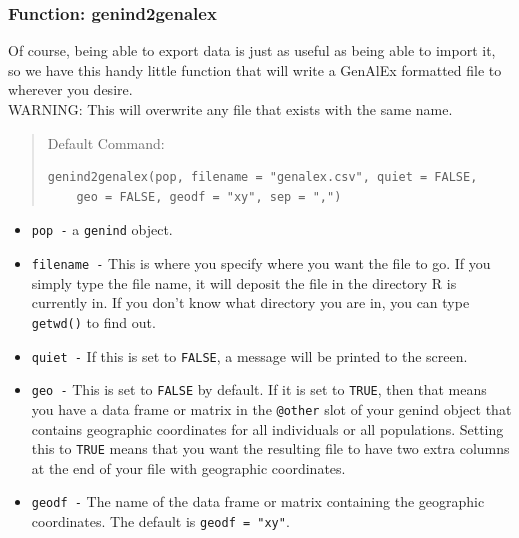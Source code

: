 \documentclass[letterpaper]{article}\usepackage[]{graphicx}\usepackage[]{color}
\makeatletter
\newenvironment{kframe}{%
 \def\at@end@of@kframe{}%
 \ifinner\ifhmode%
  \def\at@end@of@kframe{\end{minipage}}%
  \begin{minipage}{\columnwidth}%
 \fi\fi%
 \def\FrameCommand##1{\hskip\@totalleftmargin \hskip-\fboxsep
 \colorbox{shadecolor}{##1}\hskip-\fboxsep
     \hskip-\linewidth \hskip-\@totalleftmargin \hskip\columnwidth}%
 \MakeFramed {\advance\hsize-\width
   \@totalleftmargin\z@ \linewidth\hsize
   \@setminipage}}%
 {\par\unskip\endMakeFramed%
 \at@end@of@kframe}
\newenvironment{knitrout}{}{} %
\newcommand{\tab}{\hspace*{1em}}
\makeatother
\begin{document}
\subsubsection{Function: genind2genalex}\label{intro:import:genind2genalex}

\tab\tab Of course, being able to export data is just as useful as being able to import it, so we have this handy little function that will write a GenAlEx formatted file to wherever you desire.\\ 
WARNING: This will overwrite any file that exists with the same name.
\begin{quote}
Default Command:
\begin{knitrout}
\color{fgcolor}\begin{kframe}
\begin{verbatim}
genind2genalex(pop, filename = "genalex.csv", quiet = FALSE, 
    geo = FALSE, geodf = "xy", sep = ",")
\end{verbatim}
\end{kframe}
\end{knitrout}

\end{quote}
\begin{itemize}
  \item \texttt{pop -} a \texttt{genind} object.
  \item \texttt{filename -} This is where you specify where you want the file to go. If you simply type the file name, it will deposit the file in the directory R is currently in. If you don't know what directory you are in, you can type \texttt{getwd()} to find out.
  \item \texttt{quiet -} If this is set to \texttt{FALSE}, a message will be printed to the screen.
  \item \texttt{geo -} This is set to \texttt{FALSE} by default. If it is set to \texttt{TRUE}, then that means you have a data frame or matrix in the \texttt{@other} slot of your genind object that contains geographic coordinates for all individuals or all populations. Setting this to \texttt{TRUE} means that you want the resulting file to have two extra columns at the end of your file with geographic coordinates.
  \item \texttt{geodf -} The name of the data frame or matrix containing the geographic coordinates. The default is \texttt{geodf = "xy"}.
\end{itemize}
\end{document}
